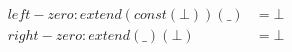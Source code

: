 \begin{align*}
  left-zero : extend(const(⊥))(\_) &= ⊥ \\
  right-zero : extend(\_)(⊥) &= ⊥
\end{align*}

